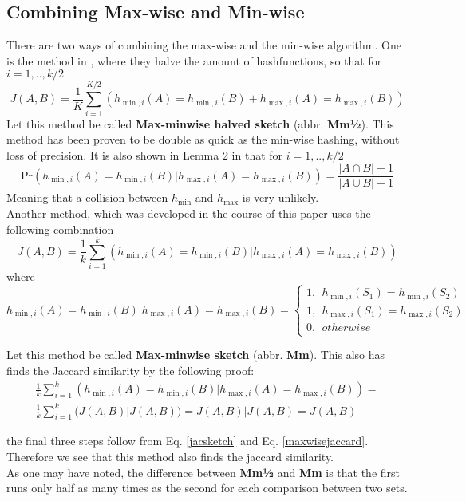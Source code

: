 \documentclass[../../main.tex]{subfiles}
\begin{document}
\subsection{Combining Max-wise and Min-wise}

There are two ways of combining the max-wise and the min-wise algorithm. One is the method in \cite{minmaxhash}, where they halve the amount of hashfunctions, so that for $i=1,..,k/2$
\begin{equation}\label{minmaxhalfjaccard}
J(A,B)=\frac{1}{K}\sum_{i=1}^{K/2}(h_{\min,i}(A) = h_{\min,i}(B) + h_{\max,i}(A) = h_{\max,i}(B))
\end{equation}
Let this method be called \textbf{Max-minwise halved sketch} (abbr. {\bf Mm½}). This method has been proven to be double as quick as the min-wise hashing, without loss of precision\cite{minmaxhash}. It is also shown in Lemma 2 in \cite{minmaxhash} that for $i=1,..,k/2$
$$
\mathrm{Pr}(h_{\min,i}(A) = h_{\min,i}(B) | h_{\max,i}(A) = h_{\max,i}(B)) = \frac{|A\cap B|-1}{|A\cup B| -1}
$$
Meaning that a collision between $h_{\min}$ and $h_{\max}$ is very unlikely.\\

Another method, which was developed in the course of this paper uses the following combination
\begin{equation}\label{minmaxjaccard}
J(A,B)=\frac{1}{k}\sum_{i=1}^{k}(h_{\min,i}(A) = h_{\min,i}(B) | h_{\max,i}(A) = h_{\max,i}(B))
\end{equation}
where
$$
h_{\min,i}(A) = h_{\min,i}(B) | h_{\max,i}(A) = h_{\max,i}(B) = \left\{ \begin{array}{ll}
												1, \ \ h_{\min,i}(S_1)=h_{\min,i}(S_2)\\
												1, \ \ h_{\max,i}(S_1)=h_{\max,i}(S_2)\\
												0, \ \ otherwise
											  \end{array}\right.
$$

Let this method be called \textbf{Max-minwise sketch} (abbr. {\bf Mm}). This also has finds the Jaccard similarity by the following proof:\\
\begin{equation}\label{proofofMinmax}
\begin{split}
\frac{1}{k}\sum_{i=1}^{k}(h_{\min,i}(A) = h_{\min,i}(B) | h_{\max,i}(A) = h_{\max,i}(B)) =\\\frac{1}{k}\sum_{i=1}^{k}(J(A,B) | J(A,B)) = J(A,B)|J(A,B) = J(A,B)
\end{split}
\end{equation}

the final three steps follow from Eq. \ref{jacsketch} and Eq. \ref{maxwisejaccard}. Therefore we see that this method also finds the jaccard similarity.\\

As one may have noted, the difference between \textbf{Mm½} and \textbf{Mm} is that the first runs only half as many times as the second for each comparison between two sets.
\end{document}
